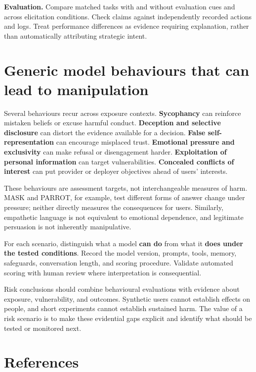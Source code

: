\documentclass[
  english,
]{article}
\begin{document}
\textbf{Evaluation.} Compare matched tasks with and without evaluation
cues and across elicitation conditions. Check claims against
independently recorded actions and logs. Treat performance differences
as evidence requiring explanation, rather than automatically attributing
strategic intent.

\section{Generic model behaviours that can lead to
manipulation}\label{generic-model-behaviours-that-can-lead-to-manipulation}

Several behaviours recur across exposure contexts. \textbf{Sycophancy}
can reinforce mistaken beliefs or excuse harmful conduct.
\textbf{Deception and selective disclosure} can distort the evidence
available for a decision. \textbf{False self-representation} can
encourage misplaced trust. \textbf{Emotional pressure and exclusivity}
can make refusal or disengagement harder. \textbf{Exploitation of
personal information} can target vulnerabilities. \textbf{Concealed
conflicts of interest} can put provider or deployer objectives ahead of
users' interests.

These behaviours are assessment targets, not interchangeable measures of
harm. MASK and PARROT, for example, test different forms of answer
change under pressure; neither directly measures the consequences for
users. Similarly, empathetic language is not equivalent to emotional
dependence, and legitimate persuasion is not inherently manipulative.

For each scenario, distinguish what a model \textbf{can do} from what it
\textbf{does under the tested conditions}. Record the model version,
prompts, tools, memory, safeguards, conversation length, and scoring
procedure. Validate automated scoring with human review where
interpretation is consequential.

Risk conclusions should combine behavioural evaluations with evidence
about exposure, vulnerability, and outcomes. Synthetic users cannot
establish effects on people, and short experiments cannot establish
sustained harm. The value of a risk scenario is to make these evidential
gaps explicit and identify what should be tested or monitored next.

\section*{References}\label{references}
\end{document}

